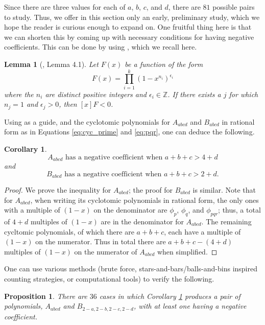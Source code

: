 \documentclass[11pt]{amsart}
\numberwithin{equation}{section}
\theoremstyle{plain}
\newtheorem{proposition}[equation]{Proposition}
\newtheorem{cor}[equation]{Corollary}
\newtheorem{lemma}[equation]{Lemma}
\theoremstyle{definition}
\begin{document}
Since there are three values for each of $a$, $b$, $c$, and $d$, there are $81$ possible pairs to study. Thus, we offer in this section only an early, preliminary study, which we hope the reader is curious enough to expand on. 
One fruitful thing here is that we can shorten this by coming up with necessary conditions for having negative coefficients. This can be done by using \cite[Lemma 4.1]{firstpaper}, which we recall here.
\begin{lemma}[\cite{firstpaper}, Lemma 4.1]\label{lem:shriram}
Let $F(x)$ be a function of the form 
\[F(x)=\prod_{i=1}^k (1-x^{n_i})^{\epsilon_i}\]
where the $n_i$ are distinct positive integers and $\epsilon_i\in \mathbb{Z}$. If there exists a $j$ for which $n_j=1$ and $\epsilon_j>0$, then $[x]F<0$.
\end{lemma}

Using \cite[Corollary 5.1]{firstpaper} as a guide, and the cyclotomic polynomials for $A_{abcd}$ and $B_{abcd}$ in rational form as in Equations \eqref{eq:cyc_prime} and \eqref{eq:pqr}, one can deduce the following.
\begin{cor}\label{cor:old}
$$A_{abcd}\text{ has a negative coefficient when } a+b+c>4+d$$
and 
$$B_{abcd}\text{ has a negative coefficient when } a+b+c>2+d.$$
\end{cor}
\begin{proof}
We prove the inequality for $A_{abcd}$; the proof for $B_{abcd}$ is similar. Note that for $A_{abcd}$, when writing its cyclotomic polynomials in rational form, the only ones with a multiple of $(1-x)$ on the denominator are $\phi_p$, $\phi_q$, and $\phi_{pqr}$; thus, a total of $4+d$ multiples of $(1-x)$ are in the denominator for $A_{abcd}$. The remaining cycltomic polynomials, of which there are $a+b+c$, each have a multiple of $(1-x)$ on the numerator. Thus in total there are $a+b+c-(4+d)$ multiples of $(1-x)$ on the numerator of $A_{abcd}$ when simplified.
\end{proof}

One can use various methods (brute force, stars-and-bars/balls-and-bins inspired counting strategies, or computational tools) to verify the following.
\begin{proposition}
There are $36$ cases in which Corollary \ref{cor:old} produces a pair of polynomials, $A_{abcd}$ and $B_{2-a,2-b,2-c,2-d}$, with at least one having a negative coefficient.
\end{proposition}

\end{document}
